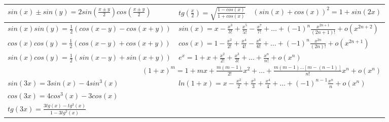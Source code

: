 \begin{tabular}{l|l|l}
    $\displaystyle sin(x) \pm sin(y) = 2sin\left(\frac{x \pm  y}{2}\right)cos\left(\frac{x \pm y}{2}\right)$ &
    $\displaystyle tg\left(\frac{x}{2}\right) = \sqrt{\frac{1 - cos(x)}{1 + cos(x)}}$ &
    $\displaystyle (sin(x) + cos(x))^2 = 1 + sin(2x)$ \\  
    \hline
    
    $\displaystyle sin(x)sin(y) = \frac{1}{2}(cos(x - y) - cos(x + y))$ &
    \multicolumn{2}{l}{$\displaystyle sin(x) = x - \frac{x^3}{3!} + \frac{x^5}{5!} - \frac{x^7}{7!} + \ldots + (-1)^n\frac{x^{2n + 1}}{(2n + 1)!} + o(x^{2n+2})$}  \\  
    
    $\displaystyle cos(x)cos(y) = \frac{1}{2}(cos(x - y) + cos(x + y))$ &
    \multicolumn{2}{l}{$\displaystyle cos(x) = 1 - \frac{x^2}{2!} + \frac{x^4}{4!} - \frac{x^6}{6!} + \ldots + (-1)^n \frac{x^{2n}}{(2n)!} + o(x^{2n+1})$}  \\  
    
    $\displaystyle sin(x)cos(y) = \frac{1}{2}(sin(x - y) + sin(x + y))$ & 
    \multicolumn{2}{l}{$\displaystyle e^x = 1 + x + \frac{x^2}{2!} + \frac{x^3}{3!} + \ldots + \frac{x^n}{n!} + o(x^n)$}  \\ \cline{1-1}  
    
    \multicolumn{3}{r}{$\displaystyle (1 + x)^m = 1 + mx +\frac{m(m-1)}{2!}x^2 + \ldots + \frac{m(m-1)\ldots[m-(n-1)]}{n!}x^n + o(x^n)$}  \\   
    \cline{1-1}
    
    $\displaystyle sin(3x) = 3sin(x) - 4sin^3(x)$ &
    \multicolumn{2}{l}{$\displaystyle ln(1+x) = x - \frac{x^2}{2} + \frac{x^3}{3} + \frac{x^4}{4} + \ldots + (-1)^{n-1}\frac{x^n}{n} + o(x^n)$}  \\  
    
    $\displaystyle cos(3x) = 4cos^3(x) - 3cos(x)$ &
    \multicolumn{2}{c}{} \\
    
    $\displaystyle tg(3x) = \frac{3tg(x) - tg^3(x)}{1 - 3tg^2(x)}$ &
    \multicolumn{2}{c}{} \\
    \hline
    
\end{tabular}